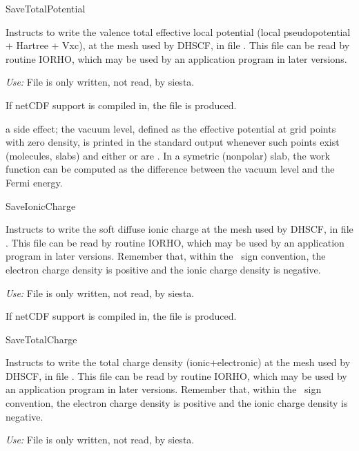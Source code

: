 \begin{fdflogicalF}{SaveTotalPotential}

  Instructs to write the valence total effective local potential
  (local pseudopotential + Hartree + Vxc), at the mesh used by DHSCF,
  in file . This file can be read by routine
  IORHO, which may be used by an application program in later
  versions.

  \textit{Use:} File  is only written, not read, by
  siesta.

  If netCDF support is compiled in, the file
   is produced.

  \note a side effect; the vacuum level, defined as the effective
  potential at grid points with zero density, is printed in the
  standard output whenever such points exist (molecules, slabs) and
  either  or 
  are \fdftrue.  In a symetric (nonpolar) slab, the work function can
  be computed as the difference between the vacuum level and the Fermi
  energy.

\end{fdflogicalF}

\begin{fdflogicalF}{SaveIonicCharge}

  Instructs to write the soft diffuse ionic charge at the mesh used by
  DHSCF, in file . This file can be read by routine
  IORHO, which may be used by an application program in later
  versions. Remember that, within the \siesta\ sign convention, the
  electron charge density is positive and the ionic charge density is
  negative.

  \textit{Use:} File  is only written, not read, by siesta.

  If netCDF support is compiled in, the file  is produced.

\end{fdflogicalF}

\begin{fdflogicalF}{SaveTotalCharge}

  Instructs to write the total charge density (ionic+electronic) at
  the mesh used by DHSCF, in file . This file
  can be read by routine IORHO, which may be used by an application
  program in later versions.  Remember that, within the \siesta\ sign
  convention, the electron charge density is positive and the ionic
  charge density is negative.

  \textit{Use:} File  is only written, not read, by
  siesta.

\end{fdflogicalF}

